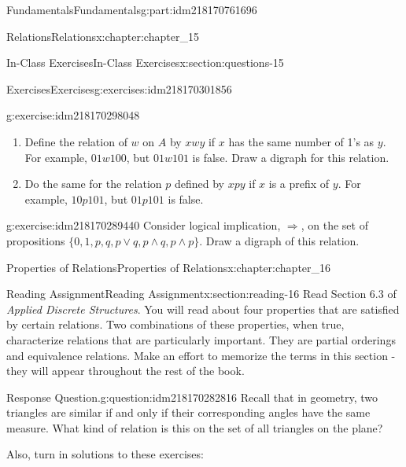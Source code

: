 \documentclass[oneside,10pt,]{book}
\numberwithin{equation}{section}
\begin{document}
\begin{partptx}{Fundamentals}{}{Fundamentals}{}{}{g:part:idm218170761696}
\begin{chapterptx}{Relations}{}{Relations}{}{}{x:chapter:chapter_15}
\begin{sectionptx}{In-Class Exercises}{}{In-Class Exercises}{}{}{x:section:questions-15}
\begin{exercises-subsection-numberless}{Exercises}{}{Exercises}{}{}{g:exercises:idm218170301856}
\begin{exercisegroup}
\begin{divisionexerciseeg}{3}{}{}{g:exercise:idm218170298048}
\begin{enumerate}[label=(\alph*)]
\item{}Define the relation of \(w\) on \(A\) by \(x w y\) if \(x\) has the same number of 1's as \(y\). For example, \(01 w 100\), but \(01 w 101\) is false. Draw a digraph for this relation.%
\item{}Do the same for the relation \(p\) defined by \(x p y\) if \(x\) is a prefix of \(y\). For example, \(10 p 101\), but \(01 p 101\) is false.%
\end{enumerate}
%
\end{divisionexerciseeg}%
\begin{divisionexerciseeg}{4}{}{}{g:exercise:idm218170289440}%
Consider logical implication, \(\Rightarrow\), on the set of propositions \(\{0,1,p,q,p\lor q, p\land q, p\land p \}\). Draw a digraph of this relation.%
\end{divisionexerciseeg}%
\end{exercisegroup}
\par\medskip\noindent
\end{exercises-subsection-numberless}
\end{sectionptx}
\end{chapterptx}
%
\typeout{************************************************}
\typeout{************************************************}
%
\begin{chapterptx}{Properties of Relations}{}{Properties of Relations}{}{}{x:chapter:chapter_16}
\index{}%
%
%
\typeout{************************************************}
\typeout{************************************************}
%
\begin{sectionptx}{Reading Assignment}{}{Reading Assignment}{}{}{x:section:reading-16}
Read Section 6.3 of \emph{Applied Discrete Structures}.  You will read about four properties that are satisfied by certain relations.  Two combinations of these properties, when true, characterize relations that are particularly important.  They are partial orderings and equivalence relations. Make an effort to memorize the terms in this section - they will appear throughout the rest of the book.%
\begin{question}{Response Question.}{g:question:idm218170282816}%
Recall that in geometry, two triangles are similar if and only if their corresponding angles have the same measure. What kind of relation is this on the set of all triangles on the plane?%
\end{question}
Also, turn in solutions to these exercises:%
%
%
\typeout{************************************************}

\end{sectionptx}
\end{chapterptx}
\end{partptx}
\end{document}
